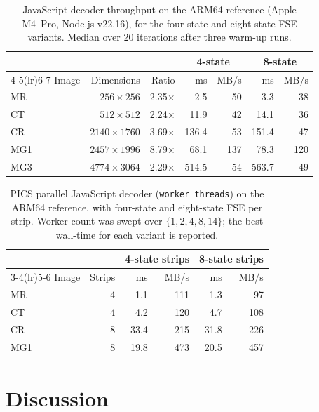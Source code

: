 \documentclass[11pt]{article}
\begin{document}
\begin{table}[htbp]
\centering
\caption{JavaScript decoder throughput on the ARM64 reference (Apple
M4~Pro, Node.js v22.16), for the four-state and eight-state FSE
variants. Median over 20 iterations after three warm-up runs.}
\label{tab:js-perf}
\begin{tabular}{lrrrrrr}
\toprule
 & & & \multicolumn{2}{c}{4-state} & \multicolumn{2}{c}{8-state} \\
\cmidrule(lr){4-5}\cmidrule(lr){6-7}
Image & Dimensions & Ratio & ms & MB/s & ms & MB/s \\
\midrule
MR  & $256{\times}256$   & 2.35$\times$ &   2.5 &  50 &   3.3 &  38 \\
CT  & $512{\times}512$   & 2.24$\times$ &  11.9 &  42 &  14.1 &  36 \\
CR  & $2140{\times}1760$ & 3.69$\times$ & 136.4 &  53 & 151.4 &  47 \\
MG1 & $2457{\times}1996$ & 8.79$\times$ &  68.1 & 137 &  78.3 & 120 \\
MG3 & $4774{\times}3064$ & 2.29$\times$ & 514.5 &  54 & 563.7 &  49 \\
\bottomrule
\end{tabular}
\end{table}

\begin{table}[htbp]
\centering
\caption{PICS parallel JavaScript decoder (\texttt{worker\_threads}) on
the ARM64 reference, with four-state and eight-state FSE per strip.
Worker count was swept over $\{1,2,4,8,14\}$; the best wall-time for
each variant is reported.}
\label{tab:pics-js}
\begin{tabular}{lrrrrr}
\toprule
 & & \multicolumn{2}{c}{4-state strips} & \multicolumn{2}{c}{8-state strips} \\
\cmidrule(lr){3-4}\cmidrule(lr){5-6}
Image & Strips &   ms & MB/s &   ms & MB/s \\
\midrule
MR  & 4 &   1.1 & 111 &   1.3 &  97 \\
CT  & 4 &   4.2 & 120 &   4.7 & 108 \\
CR  & 8 &  33.4 & 215 &  31.8 & 226 \\
MG1 & 8 &  19.8 & 473 &  20.5 & 457 \\
\bottomrule
\end{tabular}
\end{table}

\section{Discussion}
\end{document}
